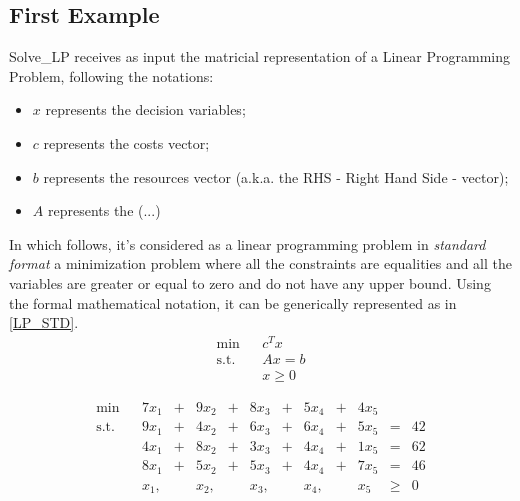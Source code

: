 \documentclass[12pt,hidelinks]{article}
\newcommand{\st}{\operatorname{s.t.}}
\begin{document}
	\subsection{First Example}
		Solve\_LP receives as input the matricial representation of a Linear Programming Problem, following the notations:

		\begin{itemize}
			\item $x$ represents the decision variables;
			\item $c$ represents the costs vector;
			\item $b$ represents the resources vector (a.k.a. the RHS - Right Hand Side - vector);
			\item $A$ represents the (...)
		\end{itemize}

		In which follows, it's considered as a linear programming problem in \emph{standard format} a minimization problem where all the constraints are equalities and all the variables are greater or equal to zero and do not have any upper bound. Using the formal mathematical notation, it can be generically represented as in \eqref{LP_STD}. 
		\begin{equation}\label{LP_STD}
			\begin{array}{llc}
				\min                & &  c^T x          \\
				\operatorname{s.t.} & &  Ax = b         \\
									& &   x \geqslant 0
			\end{array}
		\end{equation}

			\begin{equation}\label{LP_1_0_0}
				\begin{array}{llrcrcrcrcrcr}
				\min  & & 7x_1  & + & 9x_2  & + & 8x_3  & + & 5x_4  & + & 4x_5 &           &    \\
				\st   & & 9x_1  & + & 4x_2  & + & 6x_3  & + & 6x_4  & + & 5x_5 & =         & 42 \\
					  & & 4x_1  & + & 8x_2  & + & 3x_3  & + & 4x_4  & + & 1x_5 & =         & 62 \\
					  & & 8x_1  & + & 5x_2  & + & 5x_3  & + & 4x_4  & + & 7x_5 & =         & 46 \\
					  & &  x_1, &   &  x_2, &   &  x_3, &   &  x_4, &   &  x_5 & \geqslant & 0
				\end{array}
				\tag{LP1}
			\end{equation}
\end{document}
